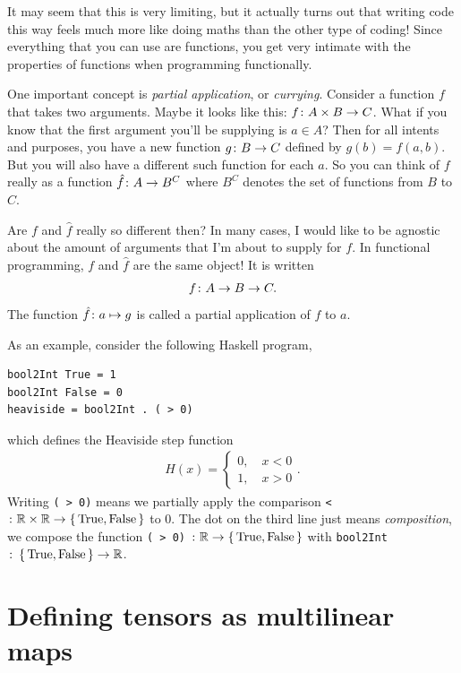 \documentclass[english, 12pt]{article}
\begin{document}
It may seem that this is very limiting, but it actually turns out that writing code this way feels much more like doing maths than the other type of coding!
Since everything that you can use are functions, you get very intimate with the properties of functions when programming functionally.

One important concept is \emph{partial application}, or \emph{currying}.
Consider a function \(f\) that takes two arguments.
Maybe it looks like this: \(f \colon A \times B \to C\).
What if you know that the first argument you'll be supplying is \(a \in A\)?
Then for all intents and purposes, you have a new function \(g \colon B \to C\) defined by \(g(b) = f(a, b)\).
But you will also have a different such function for each \(a\).
So you can think of \(f\) really as a function \(\hat f\colon A \to B^C\) where \(B^C\) denotes the set of functions from \(B\) to \(C\).

Are \(f\) and \(\hat f\) really so different then?
In many cases, I would like to be agnostic about the amount of arguments that I'm about to supply for \(f\).
In functional programming, \(f\) and \(\hat f\) are the same object!
It is written
\begin{align*}
	f \colon A \to B \to C.
\end{align*}
The function \(\hat f \colon a \mapsto g\) is called a partial application of \(f\) to \(a\).

As an example, consider the following Haskell program,
\begin{verbatim}
bool2Int True = 1
bool2Int False = 0
heaviside = bool2Int . ( > 0)
\end{verbatim}
which defines the Heaviside step function
\begin{align*}
	H(x) =
	\begin{cases}
		0, \quad x < 0\\
		1, \quad x > 0
	\end{cases}.
\end{align*}
Writing \verb|( > 0)| means we partially apply the comparison \verb|<|\(\colon \mathbb{R} \times \mathbb{R} \to \set{\textrm{True}, \textrm{False}}\) to \(0\).
The dot on the third line just means \emph{composition}, we compose the function \verb|( > 0)| \(\colon \mathbb{R} \to \set{\textrm{True}, \textrm{False}}\) with \verb|bool2Int|\(\colon \set{\textrm{True}, \textrm{False}} \to \mathbb{R}\).


\section{Defining tensors as multilinear maps}%
\label{sec:defining_tensors_as_multilinear_maps}
\end{document}
